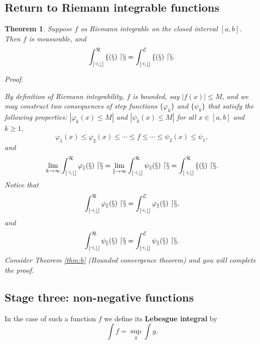 \documentclass[
]{book}
\newtheorem{theorem}{Theorem}[chapter]
\theoremstyle{definition}
\theoremstyle{definition}
\theoremstyle{definition}
\theoremstyle{definition}
\theoremstyle{remark}
\begin{document}
\subsection{Return to Riemann integrable functions}\label{return-to-riemann-integrable-functions}

\begin{theorem}
\leavevmode

Suppose \(f\) os Riemann integrable on the closed interval \([a,b]\). Then \(f\) is measurable, and
\[
\cal \int_{[a,b]}^Rf(x)\ dx=\int_{[a,b]}^Lf(x)\ dx.
\]

\emph{Proof.}

By definition of Riemann integrability, \(f\) is bounded, say \(|f(x)|\le M\), and we may construct two consequences of step functions \(\{\varphi_k\}\) and \(\{\psi_k\}\) that satisfy the following properties: \(|\varphi_k(x)\le M|\) and \(|\psi_k(x)\le M|\) for all \(x\in[a,b]\) and \(k\ge 1\),
\[
\varphi_1(x)\le \varphi_2(x) \le \cdots\le f\le\cdots\le \psi_2(x)\le \psi_1,
\]
and
\[
\lim_{k\to\infty}\cal \int_{[a,b]}^R\varphi_k(x)\ dx=\lim_{k\to\infty}\cal \int_{[a,b]}^R\psi_k(x)\ dx=\cal \int_{[a,b]}^Rf(x)\ dx.
\]
Notice that
\[
\cal \int_{[a,b]}^R\varphi_k(x)\ dx=\int_{[a,b]}^L\varphi_k(x)\ dx,
\]
and
\[
\cal \int_{[a,b]}^R\psi_k(x)\ dx=\cal \int_{[a,b]}^L\psi_k(x)\ dx.
\]
Consider Theorem \ref{thm:b} (Bounded convergence theorem) and you will complete the proof.

\end{theorem}

\subsection{Stage three: non-negative functions}\label{stage-three-non-negative-functions}

In the case of such a function \(f\) we define its \textbf{Lebesgue integral} by
\[
\int f =\sup_g\int g.
\]
\end{document}
